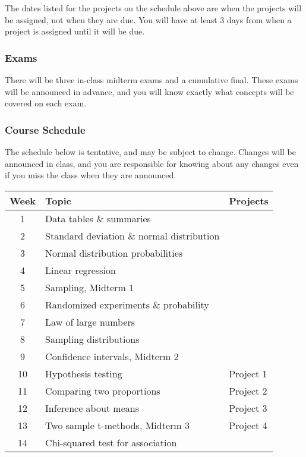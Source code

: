 \documentclass[10pt]{article}
\begin{document}
The dates listed for the projects on the schedule above are when the projects will be assigned, not when they are due. You will have at least 3 days from when a project is assigned until it will be due.

\subsubsection*{Exams}

There will be three in-class midterm exams and a cumulative final. These exams will be announced in advance, and you will know exactly what concepts will be covered on each exam.

\subsubsection*{Course Schedule} 

The schedule below is tentative, and may be subject to change. Changes will be announced in class, and you are responsible for knowing about any changes even if you miss the class when they are announced. 

\begin{center}
\begin{tabular}{|c|l|l|}
\hline
Week  & Topic & Projects \\ \hline
1  & Data tables \& summaries  &  \\
2  & Standard deviation \& normal distribution  &  \\
3  & Normal distribution probabilities  &  \\
4  & Linear regression  &  \\
5  & Sampling, Midterm 1  &  \\
6  & Randomized experiments \& probability  &  \\
7  & Law of large numbers  &  \\
8  & Sampling distributions  &  \\
9  & Confidence intervals, Midterm 2  &  \\
10  & Hypothesis testing  & Project 1 \\
11  & Comparing two proportions  & Project 2 \\
12  & Inference about means  & Project 3 \\
13  & Two sample t-methods, Midterm 3  & Project 4 \\
14  & Chi-squared test for association  &  \\ \hline
\end{tabular}
\end{center}
\end{document}
